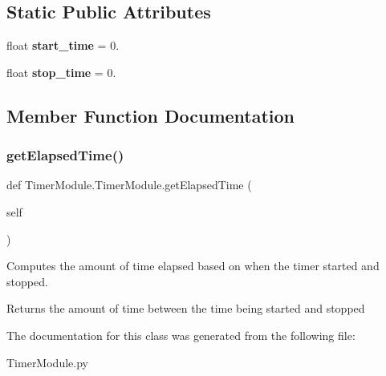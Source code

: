 \subsection*{Static Public Attributes}
\begin{DoxyCompactItemize}
\item 
\mbox{\label{classTimerModule_1_1TimerModule_ac3eb38a50c08ab04459ec116d67d648a}} 
float {\bfseries start\+\_\+time} = 0.
\item 
\mbox{\label{classTimerModule_1_1TimerModule_a99340094e75f5dad4d9acea207778c20}} 
float {\bfseries stop\+\_\+time} = 0.
\end{DoxyCompactItemize}


\subsection{Member Function Documentation}
\mbox{\label{classTimerModule_1_1TimerModule_adfa558e989426995c72df19b318aa50b}} 
\subsubsection{\texorpdfstring{get\+Elapsed\+Time()}{getElapsedTime()}}
{\footnotesize\ttfamily def Timer\+Module.\+Timer\+Module.\+get\+Elapsed\+Time (\begin{DoxyParamCaption}\item[{}]{self }\end{DoxyParamCaption})}



Computes the amount of time elapsed based on when the timer started and stopped. 

\begin{DoxyReturn}{Returns}
the amount of time between the time being started and stopped 
\end{DoxyReturn}


The documentation for this class was generated from the following file\+:\begin{DoxyCompactItemize}
\item 
Timer\+Module.\+py\end{DoxyCompactItemize}
